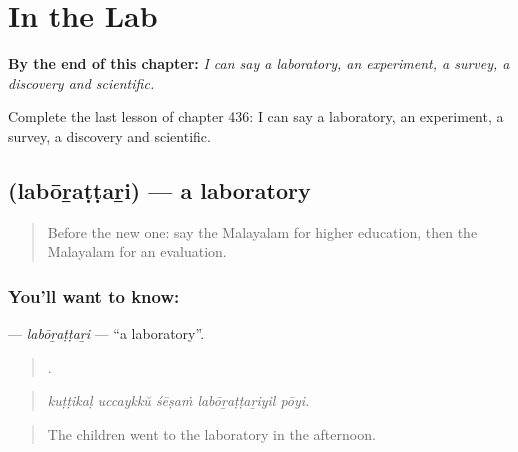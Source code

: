 
\chapter{In the Lab}
\label{ch:ml-in-the-lab}

\begin{chapteropening}
\textbf{By the end of this chapter:} \emph{I can say a laboratory, an experiment, a survey, a discovery and scientific.}

Complete the last lesson of chapter 436: I can say a laboratory, an experiment, a survey, a discovery and scientific.
\end{chapteropening}

\section[\texorpdfstring{\ml{ലബോറട്ടറി} (labōṟaṭṭaṟi)}{ലബോറട്ടറി (labōṟaṭṭaṟi)}]{ (labōṟaṭṭaṟi) — a laboratory}

\label{lesson:ML-C436-laborattari}



\begin{quote}
Before the new one: say the Malayalam for higher education, then the Malayalam for an evaluation.
\end{quote}

\subsection*{You'll want to know: }
\textbf{} — \emph{labōṟaṭṭaṟi} — \textquotedblleft{}a laboratory\textquotedblright{}.

\begin{quote}
    .
\end{quote}

\begin{quote}
\emph{kuṭṭikaḷ uccaykkŭ śēṣaṁ labōṟaṭṭaṟiyil pōyi.}
\end{quote}

\begin{quote}
The children went to the laboratory in the afternoon.
\end{quote}

